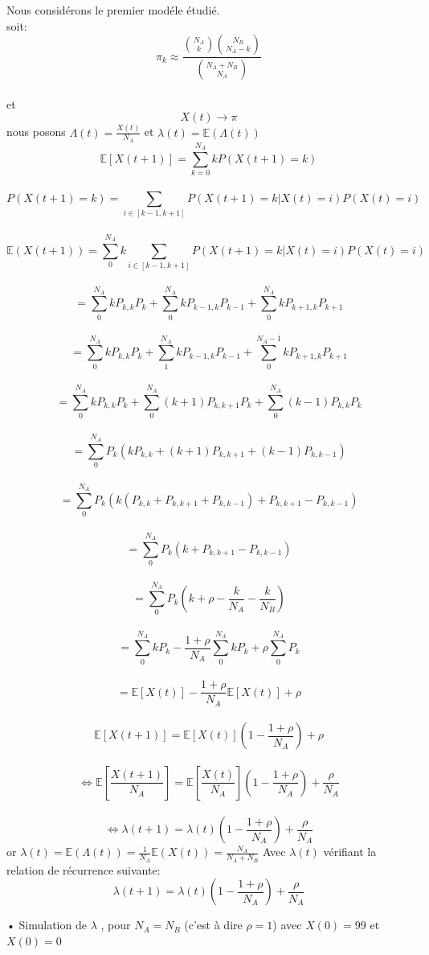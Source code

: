 \documentclass[11pt,]{article}
\begin{document}
Nous considérons le premier modéle étudié.\\
soit:
\[ \pi_k \approx \frac{\binom{N_A}{k}\binom{N_B}{N_A-k}}{\binom{N_A+N_B}{N_A}} \]\\
et \[X(t) \rightarrow \pi \] nous posons
\(\Lambda(t) =\frac{X(t)}{N_A}\) et
\(\lambda(t)=\mathbb{E}(\Lambda(t))\)\\
\[\mathbb{E}[X(t+1)]=\sum_{k=0}^{N_A}kP(X(t+1)=k)\]\\
\[P(X(t+1)=k)=\sum_{i \in [k-1,k+1]} P(X(t+1)=k|X(t)=i)P(X(t)=i) \]\\
\[\mathbb{E}(X(t+1))=\sum_0^{N_A}k\sum_{i \in [k-1,k+1]} P(X(t+1)=k|X(t)=i)P(X(t)=i)\]\\
\[= \sum_0^{N_A}k P_{k,k}P_k+\sum_0^{N_A}kP_{k-1,k}P_{k-1} + \sum_{0}^{N_A}kP_{k+1,k}P_{k+1}\]\\
\[= \sum_0^{N_A}k P_{k,k}P_k+\sum_1^{N_A}kP_{k-1,k}P_{k-1}+\sum_{0}^{N_A-1}kP_{k+1,k}P_{k+1}\]\\
\[=\sum_0^{N_A}k P_{k,k}P_k+\sum_0^{N_A}(k+1)P_{k,k+1}P_{k}+\sum_{0}^{N_A}(k-1)P_{k,k}P_{k}\]\\
\[=\sum_0^{N_A}P_k(kP_{k,k} +(k+1)P_{k,k+1}+ (k-1)P_{k,k-1})\]\\
\[=\sum_0^{N_A}P_k (k(P_{k,k}+P_{k,k+1}+P_{k,k-1}) +P_{k,k+1}-P_{k,k-1})\]\\
\[=\sum_0^{N_A}P_k(k+ P_{k,k+1}-P_{k,k-1})\]\\
\[=\sum_0^{N_A}P_k(k+\rho -\frac{k}{N_A}-\frac{k}{N_B})\]\\
\[= \sum_0^{N_A}kP_k -\frac{1+\rho}{N_A}\sum_0^{N_A}kP_k +\rho\sum_0^{N_A}P_k\]\\
\[=\mathbb{E}[X(t)]-\frac{1+\rho}{N_A}\mathbb{E}[X(t)]+ \rho \]\\
\[\mathbb{E}[X(t+1)]=\mathbb{E}[X(t)](1-\frac{1+\rho}{N_A}) +\rho\]\\
\[\Longleftrightarrow  \mathbb{E}[\frac{X(t+1)}{N_A}]=\mathbb{E}[\frac{X(t)}{N_A}](1- \frac{1+\rho}{N_A} ) +\frac{\rho}{N_A} \]\\
\[\Longleftrightarrow \lambda(t+1)=\lambda(t)(1-\frac{1+\rho}{N_A}) +\frac{\rho}{N_A} \]
or
\(\lambda(t)=\mathbb{E}(\Lambda(t))=\frac{1}{N_A}\mathbb{E}(X(t))=\frac{N_A}{N_A+N_B}\)
Avec \(\lambda(t)\) vérifiant la relation de récurrence suivante:\\
\[\lambda(t+1)=\lambda(t)(1-\frac{1+\rho}{N_A})+\frac{\rho}{N_A}\]

• Simulation de \(\lambda\) , pour \(N_A=N_B\) (c'est à dire \(\rho=1\))
avec \(X(0)=99\) et \(X(0)=0\)
\end{document}
